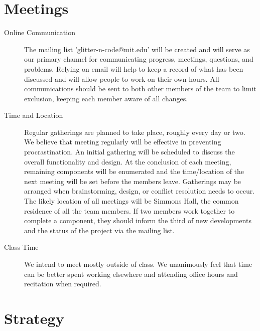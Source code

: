 \documentclass[twoside]{article}
\begin{document}
\begin{multicols}{2}
\section{Meetings}

\begin{description}
	\item[Online Communication] The mailing list 'glitter-n-code@mit.edu' will be created and will serve as our primary channel for communicating progress, meetings, questions, and problems. Relying on email will help to keep a record of what has been discussed and will allow people to work on their own hours. All communications should be sent to both other members of the team to limit exclusion, keeping each member aware of all changes.
	\item[Time and Location] Regular gatherings are planned to take place, roughly every day or two. We believe that meeting regularly will be effective in preventing procrastination. An initial gathering will be scheduled to discuss the overall functionality and design. At the conclusion of each meeting, remaining components will be enumerated and the time/location of the next meeting will be set before the members leave. Gatherings may be arranged when brainstorming, design, or conflict resolution needs to occur. The likely location of all meetings will be Simmons Hall, the common residence of all the team members. If two members work together to complete a component, they should inform the third of new developments and the status of the project via the mailing list.
	\item[Class Time] We intend to meet mostly outside of class.  We unanimously feel that time can be better spent working elsewhere and attending office hours and recitation when required.
\end{description}


\section{Strategy}


\end{multicols}
\end{document}
